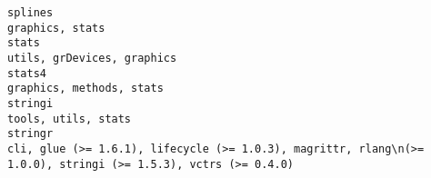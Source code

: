 \documentclass[
  letterpaper,
  DIV=11,
  numbers=noendperiod]{scrreprt}
\begin{document}
\begin{verbatim}
splines                                                                                                                                                                                                                                                                                                                                                                                                                                                                                                                                                                                                    graphics, stats
stats                                                                                                                                                                                                                                                                                                                                                                                                                                                                                                                                                                                           utils, grDevices, graphics
stats4                                                                                                                                                                                                                                                                                                                                                                                                                                                                                                                                                                                            graphics, methods, stats
stringi                                                                                                                                                                                                                                                                                                                                                                                                                                                                                                                                                                                                tools, utils, stats
stringr                                                                                                                                                                                                                                                                                                                                                                                                                                                                                                      cli, glue (>= 1.6.1), lifecycle (>= 1.0.3), magrittr, rlang\n(>= 1.0.0), stringi (>= 1.5.3), vctrs (>= 0.4.0)

\end{verbatim}
\end{document}
